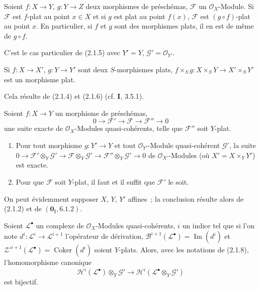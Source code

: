 \begin{corollary}[2.1.6]
\label{IV.2.1.6-fr}
Soient $f:X\to Y$, $g:Y\to Z$ deux morphismes de préschémas, $\mathscr F$ un
$\mathcal O_X$-Module. Si $\mathscr F$ est $f$-plat au point $x\in X$ et si
$g$ est plat au point $f(x)$, $\mathscr F$ est $(g\circ f)$-plat au point $x$. En
particulier, si $f$ et $g$ sont des morphismes plats, il en est de même de
$g\circ f$.
\end{corollary}

C'est le cas particulier de (2.1.5) avec $Y'=Y$, $\mathscr G'=\mathcal O_{Y'}$.

\begin{corollary}[2.1.7]
\label{IV.2.1.7-fr}
Si $f:X\to X'$, $g:Y\to Y'$ sont deux $S$-morphismes plats,
$f\times_S g:X\times_S Y\to X'\times_S Y'$ est un morphisme plat.
\end{corollary}

Cela résulte de (2.1.4) et (2.1.6) (cf. \textbf{I}, 3.5.1).

\begin{proposition}[2.1.8]
\label{IV.2.1.8-fr}
Soient $f:X\to Y$ un morphisme de préschémas,
\[
0\to\mathscr F'\to\mathscr F\to\mathscr F''\to0
\]
une suite exacte de $\mathcal O_X$-Modules quasi-cohérents, telle que
$\mathscr F''$ soit $Y$-plat.
\begin{enumerate}
\item[\textup{(i)}] Pour tout morphisme $g:Y'\to Y$ et tout $\mathcal O_{Y'}$-Module
quasi-cohérent $\mathscr G'$, la suite
$0\to\mathscr F'\otimes_Y\mathscr G'\to
\mathscr F\otimes_Y\mathscr G'\to
\mathscr F''\otimes_Y\mathscr G'\to0$
de $\mathcal O_{X'}$-Modules (où $X'=X\times_Y Y'$) est exacte.
\item[\textup{(ii)}] Pour que $\mathscr F$ soit $Y$-plat, il faut et il suffit que
$\mathscr F'$ le soit.
\end{enumerate}
\end{proposition}

On peut évidemment supposer $X$, $Y$, $Y'$ affines~; la conclusion résulte
alors de (2.1.2) et de $(\mathbf{0}_{\mathrm I},6.1.2)$.

\begin{corollary}[2.1.9]
\label{IV.2.1.9-fr}
Soient $\mathscr L^\bullet$ un complexe de $\mathcal O_X$-Modules
quasi-cohérents, $i$ un indice tel que si l'on note
$d^i:\mathscr L^i\to\mathscr L^{i+1}$ l'opérateur de dérivation,
$\mathscr B^{i+1}(\mathscr L^\bullet)=\operatorname{Im}(d^i)$ et
$\mathscr Z'^{i+1}(\mathscr L^\bullet)=\operatorname{Coker}(d^i)$ soient
$Y$-plats. Alors, avec les notations de \textup{(2.1.8)}, l'homomorphisme canonique
\[
\mathscr H^i(\mathscr L^\bullet)\otimes_Y\mathscr G'
\longrightarrow
\mathscr H^i(\mathscr L^\bullet\otimes_Y\mathscr G')
\]
est bijectif.
\end{corollary}

